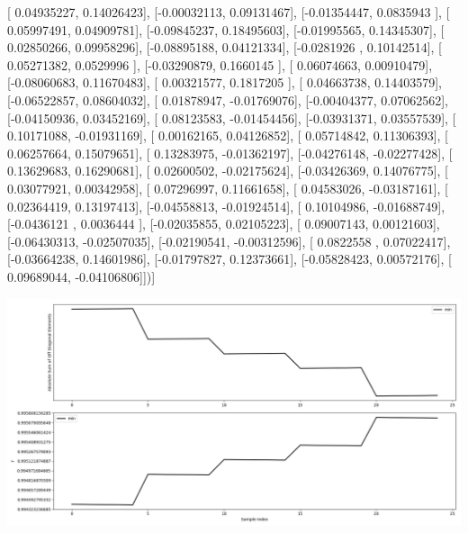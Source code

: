 \documentclass{article}
\begin{document}
       [ 0.04935227,  0.14026423],
       [-0.00032113,  0.09131467],
       [-0.01354447,  0.0835943 ],
       [ 0.05997491,  0.04909781],
       [-0.09845237,  0.18495603],
       [-0.01995565,  0.14345307],
       [ 0.02850266,  0.09958296],
       [-0.08895188,  0.04121334],
       [-0.0281926 ,  0.10142514],
       [ 0.05271382,  0.0529996 ],
       [-0.03290879,  0.1660145 ],
       [ 0.06074663,  0.00910479],
       [-0.08060683,  0.11670483],
       [ 0.00321577,  0.1817205 ],
       [ 0.04663738,  0.14403579],
       [-0.06522857,  0.08604032],
       [ 0.01878947, -0.01769076],
       [-0.00404377,  0.07062562],
       [-0.04150936,  0.03452169],
       [ 0.08123583, -0.01454456],
       [-0.03931371,  0.03557539],
       [ 0.10171088, -0.01931169],
       [ 0.00162165,  0.04126852],
       [ 0.05714842,  0.11306393],
       [ 0.06257664,  0.15079651],
       [ 0.13283975, -0.01362197],
       [-0.04276148, -0.02277428],
       [ 0.13629683,  0.16290681],
       [ 0.02600502, -0.02175624],
       [-0.03426369,  0.14076775],
       [ 0.03077921,  0.00342958],
       [ 0.07296997,  0.11661658],
       [ 0.04583026, -0.03187161],
       [ 0.02364419,  0.13197413],
       [-0.04558813, -0.01924514],
       [ 0.10104986, -0.01688749],
       [-0.0436121 ,  0.0036444 ],
       [-0.02035855,  0.02105223],
       [ 0.09007143,  0.00121603],
       [-0.06430313, -0.02507035],
       [-0.02190541, -0.00312596],
       [ 0.0822558 ,  0.07022417],
       [-0.03664238,  0.14601986],
       [-0.01797827,  0.12373661],
       [-0.05828423,  0.00572176],
       [ 0.09689044, -0.04106806]])]
\begin{center}
\includegraphics[scale=.9]{report_pickled_controls196/control_dpn_all.png}

\end{center}
\end{document}
